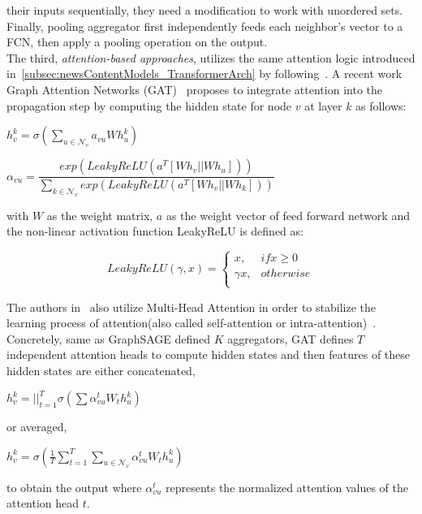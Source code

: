 their inputs sequentially, they need a modification to work with unordered sets. Finally, pooling aggregator first independently feeds each neighbor's vector to a FCN, then apply a pooling operation on the output.\\
The third, \emph{attention-based approaches}, utilizes the same attention logic introduced in~\ref{subsec:newsContentModels_TransformerArch} by following~\cite{NeuralMachineTranslationByJointlyLearning_Bahdanau}. A recent work Graph Attention Networks (GAT)~\parencite{GraphAttentionNetworks_Velickovic} proposes to integrate attention into the propagation step by computing the hidden state for node $v$ at layer $k$ as follows:
\begin{center}
    $h_v^{k} = \sigma(\sum\limits_{u \in \mathcal{N}_v} a_{vu} W h_u^k)$ \\
\end{center}
\begin{center}
    $\alpha_{vu} = \dfrac{exp(LeakyReLU(a^T[Wh_v || Wh_u]))}{\sum\limits_{k \in \mathcal{N}_v}exp(LeakyReLU(a^T[W h_v || W h_k]))}$
\end{center}
with $W$ as the weight matrix, $a$ as the weight vector of feed forward network and the non-linear activation function LeakyReLU is defined as:
\begin{center}
    \[LeakyReLU(\gamma, x) =
        \begin{cases}
            x,         & if x \geq 0 \\
            \gamma  x, & otherwise   \\
        \end{cases}
    \]
\end{center}
The authors in~\cite{GraphAttentionNetworks_Velickovic} also utilize Multi-Head Attention in order to stabilize the
learning process of attention(also called self-attention or intra-attention)~\parencite{AttentionIsAllYouNeed_Vaswani}. Concretely, same as GraphSAGE defined $K$ aggregators, GAT defines $T$ independent attention heads to compute hidden states and then features of these hidden states are either concatenated,
\begin{center}
    $h_v^k = ||_{t=1}^T \sigma(\sum\limits \alpha_{vu}^t W_t h_u^k)$
\end{center}
or averaged,
\begin{center}
    $h_v^k = \sigma(\frac{1}{T} \sum\limits_{t=1}^T \sum\limits_{u \in \mathcal{N}_v} \alpha_{vu}^t W_t h_u^k)$
\end{center}
to obtain the output where $\alpha_{vu}^t$ represents the normalized attention values of the attention head $t$.\\
